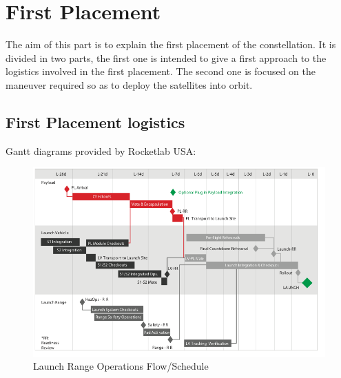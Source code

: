 
\section{First Placement}
The aim of this part is to explain the first placement of the constellation. It is divided in two parts, the first one is intended to give a first approach to the logistics involved in the first placement. The second one is focused on the maneuver required so as to deploy the satellites into orbit. 
\subsection{First Placement logistics}
Gantt diagrams provided by Rocketlab USA:

\begin{figure}[h!]
\centering 
\includegraphics[scale=0.7]{./sections/Constellation_Deployment/S4-First_Placement/Images_S4/Picture_1_S4.png} 
\caption{Launch Range Operations Flow/Schedule}
\label{fig:gantt1}
\end{figure}

